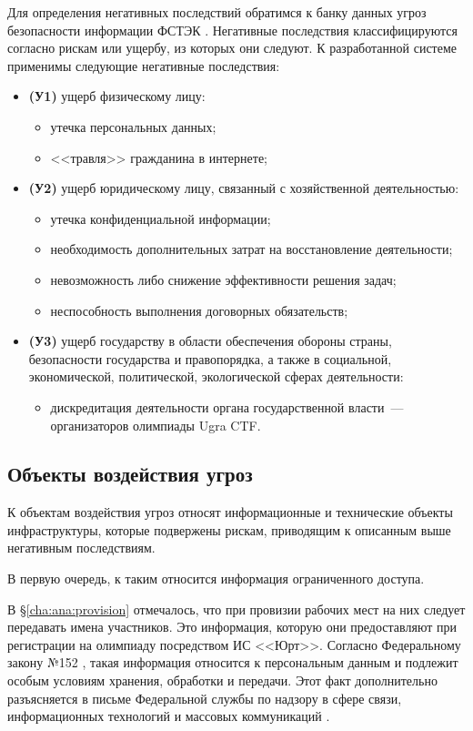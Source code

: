 Для определения негативных последствий обратимся к банку данных угроз безопасности информации ФСТЭК \cite{FSTECbank}. Негативные последствия классифицируются согласно рискам или ущербу, из которых они следуют. К разработанной системе применимы следующие негативные последствия:
\begin{itemize}
\item \textbf{(У1)} ущерб физическому лицу:
  \begin{itemize}
  \item утечка персональных данных;
  \item <<травля>> гражданина в интернете;
  \end{itemize}
\item \textbf{(У2)} ущерб юридическому лицу, связанный с хозяйственной деятельностью:
  \begin{itemize}
  \item утечка конфиденциальной информации;
  \item необходимость дополнительных затрат на восстановление деятельности;
  \item невозможность либо снижение эффективности решения задач;
  \item неспособность выполнения договорных обязательств;
  \end{itemize}
\item \textbf{(У3)} ущерб государству в области обеспечения обороны страны, безопасности государства и правопорядка, а также в социальной, экономической, политической, экологической сферах деятельности:
  \begin{itemize}
  \item дискредитация деятельности органа государственной власти~--- организаторов олимпиады Ugra CTF.
  \end{itemize}
\end{itemize}

\subsection{Объекты воздействия угроз}

К объектам воздействия угроз относят информационные и технические объекты инфраструктуры, которые подвержены рискам, приводящим к описанным выше негативным последствиям.

В первую очередь, к таким относится информация ограниченного доступа.

В \S \ref{cha:ana:provision} отмечалось, что при провизии рабочих мест на них следует передавать имена участников. Это информация, которую они предоставляют при регистрации на олимпиаду посредством ИС <<Юрт>>. Согласно Федеральному закону №152 \cite{152}, такая информация относится к персональным данным и подлежит особым условиям хранения, обработки и передачи. Этот факт дополнительно разъясняется в письме Федеральной службы по надзору в сфере связи, информационных технологий и массовых коммуникаций \cite{152letter}.

